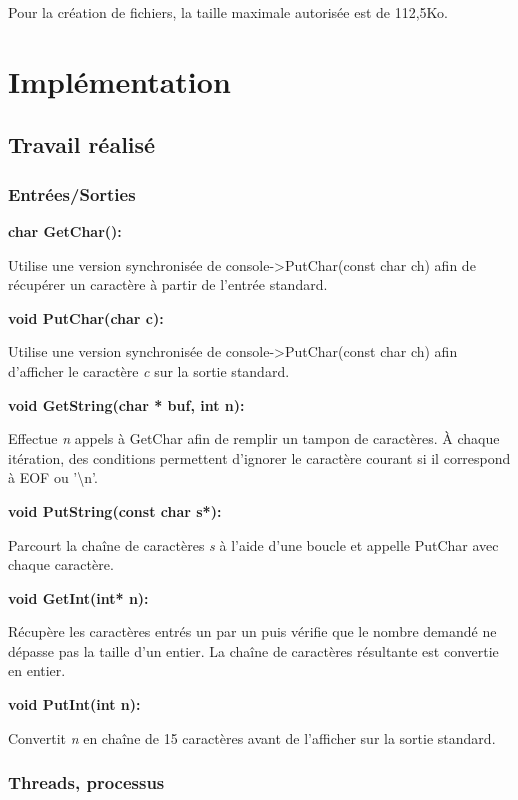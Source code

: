 \documentclass[12pt]{report}
\begin{document}
\bigskip
Pour la création de fichiers, la taille maximale autorisée est de 112,5Ko.


\chapter{Implémentation}

\section{Travail réalisé}
\bigskip

\subsection{Entrées/Sorties}

\textbf{char GetChar():} 

Utilise une version synchronisée de console->PutChar(const char ch)
afin de récupérer un caractère à partir de l'entrée standard.

\bigskip

\textbf{void PutChar(char c):} 

Utilise une version synchronisée de console->PutChar(const char ch)
afin d'afficher le caractère \textit{c} sur la sortie standard.
\bigskip


\textbf{void GetString(char * buf, int n):} 

Effectue \textit{n} appels à GetChar afin de remplir un tampon de caractères.
À chaque itération, des conditions permettent d'ignorer le caractère courant si
il correspond à EOF ou '\textbackslash n'.

\bigskip

\textbf{void PutString(const char s*):}

Parcourt la chaîne de caractères \textit{s} à l'aide d'une boucle et appelle PutChar avec chaque caractère.
\bigskip	
	

\textbf{void GetInt(int* n):}	
	
Récupère les caractères entrés un par un puis vérifie que le nombre demandé ne dépasse pas la taille d'un entier.
La chaîne de caractères résultante est convertie en entier.
\bigskip

\textbf{void PutInt(int n):}

Convertit \textit{n} en chaîne de 15 caractères avant de l'afficher sur la sortie standard.
\newpage	


\subsection{Threads, processus}
\end{document}
